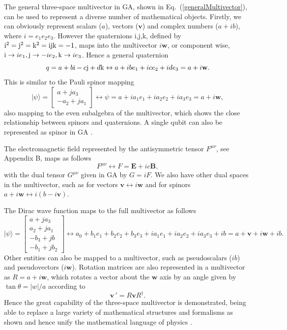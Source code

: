 \documentclass[12pt,aps,prb,preprint]{revtex4}   %
\newcommand{\be}{\begin{equation}}
\newcommand{\ee}{\end{equation}}
\newcommand{\iGA}{{i}}
\begin{document}
The general three-space multivector in GA, shown in Eq.~(\ref{generalMultivector}), can be used to represent a diverse number of mathematical objects.
Firstly, we can obviously represent scalars ($a$), vectors ($\textbf{v}$) and complex numbers ($a+ \iGA b$), where $ i = e_1 e_2 e_3 $.  However the quaternions  i,j,k, defined by $ \rm{i}^2 = \rm{j}^2 = \rm{k}^2 = \rm{i j k} = -1 $, maps into the multivector $\iGA \textbf{w} $, or component wise, $ {\rm{i}} \rightarrow \iGA e_1 , {\rm{j}} \rightarrow  - \iGA e_2 , {\rm{k}} \rightarrow \iGA e_3 $.  Hence a general quaternion
\be
q = a + b {\rm{i}}  - c {\rm{j}} + d {\rm{k}} \leftrightarrow  a + \iGA b e_1 + \iGA c e_2 + \iGA d e_3 = a + \iGA \textbf{w} .
\ee 
This is similar to the Pauli spinor mapping 
\be \label{SpinorMapping}
| \psi \rangle = \begin{bmatrix} a + j a_3  \\ -a_2 + j a_1  \end{bmatrix} \leftrightarrow \psi = a + i a_1 e_1 + i a_2 e_2 + i a_3 e_3 = a + \iGA \textbf{w},
\ee
also mapping to the even subalgebra of the multivector, which shows the close relationship between spinors and quaternions.  A single qubit can also be represented as spinor in GA \cite{CIL}.

The electromagnetic field represented by the antisymmetric tensor $ F^{\mu \nu} $, see Appendix B, maps as follows
\be \label{FieldTensorMapping}
F^{\mu \nu} \leftrightarrow F = \textbf{E}+\iGA c \textbf{B} ,
\ee
with the dual tensor $ G^{\mu \nu} $ given in GA by $ G = \iGA F $. We also have other dual spaces in the multivector, such as for vectors $ \textbf{v} \leftrightarrow \iGA \textbf{w} $ and for spinors $ a+ \iGA \textbf{w} \leftrightarrow \iGA (b - \iGA \textbf{v}) $.

The Dirac wave function maps to the full multivector as follows
\be \label{DiracWaveFnMapping}
 | \psi \rangle = \begin{bmatrix} a + j a_3  \\ a_2 + j a_1  \\ - b_3 + j b  \\ -b_1 + j b_2  \end{bmatrix} \leftrightarrow  a_0 + b_1 e_1 + b_2 e_2 + b_3 e_3 + i a_1 e_1 + i a_2 e_2 + i a_3 e_3   + \iGA b = a + \textbf{v} + \iGA \textbf{w} + \iGA b  .
\ee
Other entities can also be mapped to a multivector, such as pseudoscalars ($\iGA b $) and pseudovectors ($ \iGA \textbf{w}$).
Rotation matrices are also represented in a multivector as $ R = a + \iGA \textbf{w} $, which rotates a vector about the $ \textbf{w} $ axis by an angle given by $ \tan \theta = |w|/a $ according to
\be
\textbf{v} \, ' = R \textbf{v} R^{\dagger} .
\ee
Hence the great capability of the three-space multivector is demonstrated, being able to replace a large variety of mathematical structures and formalisms as shown and hence unify the mathematical language of physics \cite{GA2}. 
\end{document}
